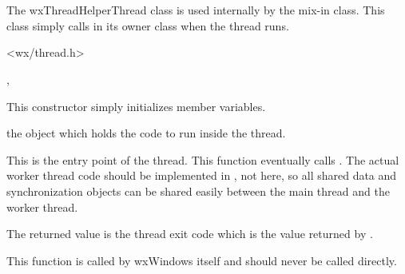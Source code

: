 \section{}\label{wxThreadHelperThread}

The wxThreadHelperThread class is used internally by the
 mix-in class.  This class simply
calls  in its owner class
when the thread runs.




<wx/thread.h>


, 


\label{wxthreadhelperthreadctor}


This constructor simply initializes member variables.



the  object which holds the code to
run inside the thread.

\label{wxthreadhelperthreadentry}


This is the entry point of the thread.  This function eventually calls
.  The actual worker
thread code should be implemented in
, not here, so all
shared data and synchronization objects can be shared easily between the
main thread and the worker thread.

The returned value is the thread exit code which is the value returned by
.

This function is called by wxWindows itself and should never be called
directly.

\label{wxthreadhelperthreadcallentry}

